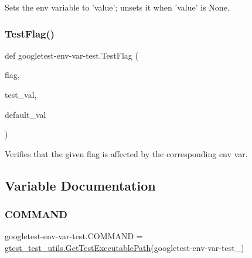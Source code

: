 \begin{DoxyVerb}Sets the env variable to 'value'; unsets it when 'value' is None.\end{DoxyVerb}
 \mbox{\label{namespacegoogletest-env-var-test_a7b8631f31d258198990b9a6004faa8a7}} 
\subsubsection{\texorpdfstring{TestFlag()}{TestFlag()}}
{\footnotesize\ttfamily def googletest-\/env-\/var-\/test.\+Test\+Flag (\begin{DoxyParamCaption}\item[{}]{flag,  }\item[{}]{test\+\_\+val,  }\item[{}]{default\+\_\+val }\end{DoxyParamCaption})}

\begin{DoxyVerb}Verifies that the given flag is affected by the corresponding env var.\end{DoxyVerb}
 

\subsection{Variable Documentation}
\mbox{\label{namespacegoogletest-env-var-test_a1973327f302e133104ae3ad3eecf17f3}} 
\subsubsection{\texorpdfstring{COMMAND}{COMMAND}}
{\footnotesize\ttfamily googletest-\/env-\/var-\/test.\+C\+O\+M\+M\+A\+ND = \mbox{\hyperlink{namespacegtest__test__utils_a89ed3717984a80ffbb7a9c92f71b86a2}{gtest\+\_\+test\+\_\+utils.\+Get\+Test\+Executable\+Path}}(\textquotesingle{}googletest-\/env-\/var-\/test\+\_\+\textquotesingle{})}

\mbox{\label{namespacegoogletest-env-var-test_ade23d144de09227d3ee09500bddcffd2}} 
